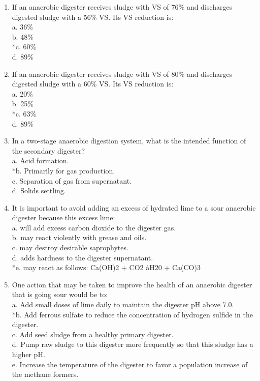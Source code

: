 \documentclass{article}
\begin{document}
\begin{enumerate}
\item  If an anaerobic digester receives sludge with VS of 76\% and discharges digested sludge with a 56\% VS.  Its VS reduction is: \\

a. 36\% \\
b. 48\% \\
*c. 60\% \\
d. 89\% \\

\item  If an anaerobic digester receives sludge with VS of 80\% and discharges digested sludge with a 60\% VS.  Its VS reduction is: \\

a. 20\% \\
b. 25\% \\
*c. 63\% \\
d. 89\% \\

\item  In a two-stage anaerobic digestion system, what is the intended function of the secondary digester? \\

a. Acid formation. \\
*b. Primarily for gas production. \\
c. Separation of gas from supernatant. \\
d. Solids settling. \\

\item  It is important to avoid adding an excess of hydrated lime to a sour anaerobic digester because this excess lime: \\

a. will add excess carbon dioxide to the digester gas. \\
b. may react violently with grease and oils. \\
c. may destroy desirable saprophytes. \\
d. adds hardness to the digester supernatant. \\
*e. may react as follows: Ca(OH)2 + CO2
àH20 + Ca(CO)3 \\

\item  One action that may be taken to improve the health of an anaerobic digester that is going sour would be to: \\

a. Add small doses of lime daily to maintain the digester pH above 7.0. \\
*b. Add ferrous sulfate to reduce the concentration of hydrogen sulfide in the digester. \\
c. Add seed sludge from a healthy primary digester. \\
d. Pump raw sludge to this digester more frequently so that this sludge has a higher pH. \\
e. Increase the temperature of the digester to favor a population increase of the methane formers. \\


\end{enumerate}
\end{document}
